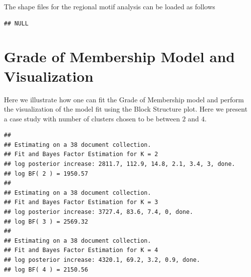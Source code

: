 \documentclass[12pt]{article}
\begin{document}
The shape files for the regional motif analysis can be loaded as follows

\begin{knitrout}
\color{fgcolor}\begin{kframe}
\begin{alltt}
 \hlkwb{<-} \hlopt{::}\hlstd{(}\hlstd{(}\hlstd{,} \hlstd{,}
                              \hlstd{=} \hlstd{))}
\end{alltt}


{\ttfamily\noindent{}}\begin{alltt}
\end{alltt}
\begin{verbatim}
## NULL
\end{verbatim}
\end{kframe}
\end{knitrout}

\section{Grade of Membership Model and Visualization}

Here we illustrate how one can fit the Grade of Membership model and perform the visualization of the model fit using the Block Structure plot. Here we present a case study with number of clusters chosen to be between $2$ and $4$.

\begin{knitrout}
\color{fgcolor}\begin{kframe}
\begin{alltt}
\hlkwb{=}\hlopt{$}
 \hlkwb{=} \hlopt{$}
 \hlkwb{<-} \hlopt{::} \hlstd{=}\hlopt{:}\hlstd{,} \hlstd{=}\hlstd{)}
\end{alltt}
\begin{verbatim}
## 
## Estimating on a 38 document collection.
## Fit and Bayes Factor Estimation for K = 2
## log posterior increase: 2811.7, 112.9, 14.8, 2.1, 3.4, 3, done.
## log BF( 2 ) = 1950.57
## 
## Estimating on a 38 document collection.
## Fit and Bayes Factor Estimation for K = 3
## log posterior increase: 3727.4, 83.6, 7.4, 0, done.
## log BF( 3 ) = 2569.32
## 
## Estimating on a 38 document collection.
## Fit and Bayes Factor Estimation for K = 4
## log posterior increase: 4320.1, 69.2, 3.2, 0.9, done.
## log BF( 4 ) = 2150.56
\end{verbatim}
\end{kframe}
\end{knitrout}
\end{document}
